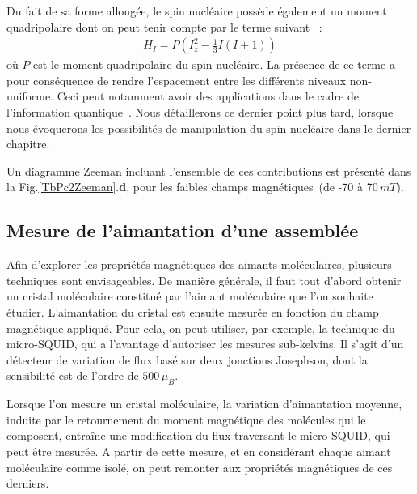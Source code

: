 Du fait de sa forme allongée, le spin nucléaire possède également un moment quadripolaire dont on peut tenir compte par le terme suivant~\cite{Bleaney1961} :
\begin{eqnarray}
H_I = P\left(I_z^2 - \frac{1}{3}I(I+1)\right)
\end{eqnarray}
où $P$ est le moment quadripolaire du spin nucléaire. La présence de ce terme a pour conséquence de rendre l'espacement entre les différents niveaux non-uniforme. Ceci peut notamment avoir des applications dans le cadre de l'information quantique~\cite{Leuenberger2003}. Nous détaillerons ce dernier point plus tard, lorsque nous évoquerons les possibilités de manipulation du spin nucléaire dans le dernier chapitre.

Un diagramme Zeeman incluant l'ensemble de ces contributions est présenté dans la Fig.\ref{TbPc2Zeeman}.\textbf{d}, pour les faibles champs magnétiques~(de -70 à 70$\,mT$).



\subsection{Mesure de l'aimantation d'une assemblée}
Afin d'explorer les propriétés magnétiques des aimants moléculaires, plusieurs techniques sont envisageables. De manière générale, il faut tout d'abord obtenir un cristal moléculaire constitué par l'aimant moléculaire que l'on souhaite étudier. L'aimantation du cristal est ensuite mesurée en fonction du champ magnétique appliqué. Pour cela, on peut utiliser, par exemple, la technique du micro-SQUID, qui a l'avantage d'autoriser les mesures sub-kelvins. Il s'agit d'un détecteur de variation de flux basé sur deux jonctions Josephson, dont la sensibilité est de l'ordre de $500\, \mu_B$.

Lorsque l'on mesure un cristal moléculaire, la variation d'aimantation moyenne, induite par le retournement du moment magnétique des molécules qui le composent, entraîne une modification du flux traversant le micro-SQUID, qui peut être mesurée. A partir de cette mesure, et en considérant chaque aimant moléculaire comme isolé, on peut remonter aux propriétés magnétiques de ces derniers.

